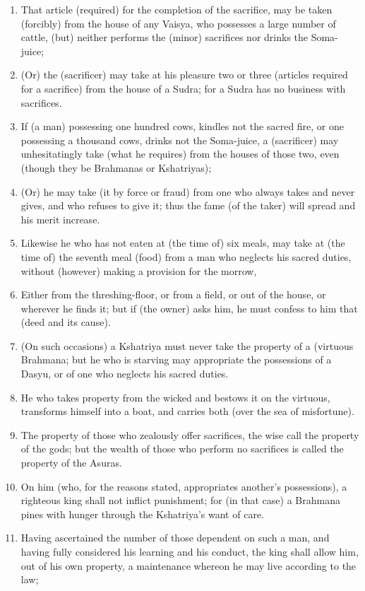 \begin{enumerate}
\item That article (required) for the completion of the sacrifice, may be taken (forcibly) from the house of any Vaisya, who possesses a large number of cattle, (but) neither performs the (minor) sacrifices nor drinks the Soma-juice;
\item (Or) the (sacrificer) may take at his pleasure two or three (articles required for a sacrifice) from the house of a Sudra; for a Sudra has no business with sacrifices.
\item If (a man) possessing one hundred cows, kindles not the sacred fire, or one possessing a thousand cows, drinks not the Soma-juice, a (sacrificer) may unhesitatingly take (what he requires) from the houses of those two, even (though they be Brahmanas or Kshatriyas);
\item (Or) he may take (it by force or fraud) from one who always takes and never gives, and who refuses to give it; thus the fame (of the taker) will spread and his merit increase.
\item Likewise he who has not eaten at (the time of) six meals, may take at (the time of) the seventh meal (food) from a man who neglects his sacred duties, without (however) making a provision for the morrow,
\item Either from the threshing-floor, or from a field, or out of the house, or wherever he finds it; but if (the owner) asks him, he must confess to him that (deed and its cause).
\item (On such occasions) a Kshatriya must never take the property of a (virtuous Brahmana; but he who is starving may appropriate the possessions of a Dasyu, or of one who neglects his sacred duties.
\item He who takes property from the wicked and bestows it on the virtuous, transforms himself into a boat, and carries both (over the sea of misfortune).
\item The property of those who zealously offer sacrifices, the wise call the property of the gods; but the wealth of those who perform no sacrifices is called the property of the Asuras.
\item On him (who, for the reasons stated, appropriates another's possessions), a righteous king shall not inflict punishment; for (in that case) a Brahmana pines with hunger through the Kshatriya's want of care.
\item Having ascertained the number of those dependent on such a man, and having fully considered his learning and his conduct, the king shall allow him, out of his own property, a maintenance whereon he may live according to the law;

\end{enumerate}
